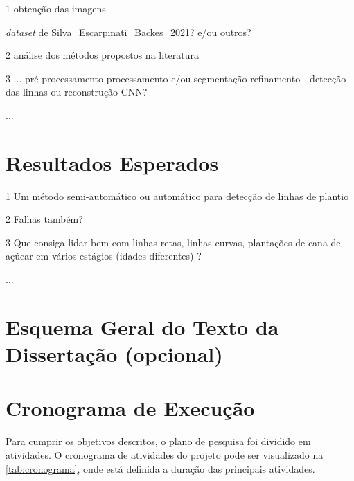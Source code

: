 \documentclass[12pt, a4paper, english, brazil]{article}
\newcommand{\textBlue}[1]{{{\color{blue} #1}}}
\begin{document}
\textBlue{
1 obtenção das imagens

    \textit{dataset} de Silva\_Escarpinati\_Backes\_2021? e/ou outros?

2 análise dos métodos propostos na literatura

3 ...
    pré processamento
    processamento e/ou segmentação
    refinamento - detecção das linhas ou reconstrução
    CNN?

...
}

\section{Resultados Esperados}

\textBlue{
1 Um método semi-automático ou automático para detecção de linhas de plantio

2 Falhas também?

3 Que consiga lidar bem com linhas retas, linhas curvas, plantações de cana-de-açúcar em vários estágios (idades diferentes) ?

...
}

\section{Esquema Geral do Texto da Dissertação (opcional)}

\section{Cronograma de Execução}

Para cumprir os objetivos descritos, o plano de pesquisa foi dividido em atividades. O cronograma de atividades do projeto pode ser visualizado na \autoref{tab:cronograma}, onde está definida a
duração das principais atividades.
\end{document}
